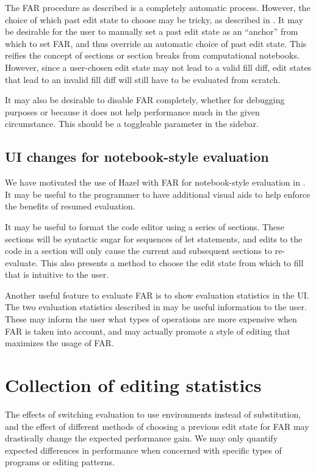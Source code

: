 The FAR procedure as described is a completely automatic process. However, the choice of which past edit state to choose may be tricky, as described in . It may be desirable for the user to manually set a past edit state as an ``anchor'' from which to set FAR, and thus override an automatic choice of past edit state. This reifies the concept of sections or section breaks from computational notebooks. However, since a user-chosen edit state may not lead to a valid fill diff, edit states that lead to an invalid fill diff will still have to be evaluated from scratch.

It may also be desirable to disable FAR completely, whether for debugging purposes or because it does not help performance much in the given circumstance. This should be a toggleable parameter in the sidebar.

\subsection{UI changes for notebook-style evaluation}
\label{sec:far-improv-notebook-ui}

We have motivated the use of Hazel with FAR for notebook-style evaluation in . It may be useful to the programmer to have additional visual aids to help enforce the benefits of resumed evaluation.

It may be useful to format the code editor using a series of sections. These sections will be syntactic sugar for sequences of let statements, and edits to the code in a section will only cause the current and subsequent sections to re-evaluate. This also presents a method to choose the edit state from which to fill that is intuitive to the user.

Another useful feature to evaluate FAR is to show evaluation statistics in the UI. The two evaluation statistics described in  may be useful information to the user. These may inform the user what types of operations are more expensive when FAR is taken into account, and may actually promote a style of editing that maximizes the usage of FAR.

\section{Collection of editing statistics}
\label{sec:collect-edit-statistics}

The effects of switching evaluation to use environments instead of substitution, and the effect of different methods of choosing a previous edit state for FAR may drastically change the expected performance gain. We may only quantify expected differences in performance when concerned with specific types of programs or editing patterns.

